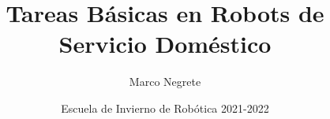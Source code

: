 \documentclass[10pt,spanish,aspectratio=1610]{beamer}
\begin{document}
\renewcommand{\tablename}{Tabla}
\renewcommand{\figurename}{Figura}

\title[Tareas Básicas en Robots de Servicio Doméstico]{Tareas Básicas en Robots de Servicio Doméstico}
\author[Marco Negrete]{Marco Negrete}
\date[EIR 2022]{Escuela de Invierno de Robótica 2021-2022}

\begin{frame}
\titlepage
\end{frame}

\begin{frame}
  \tableofcontents
\end{frame}



 


\end{document}
